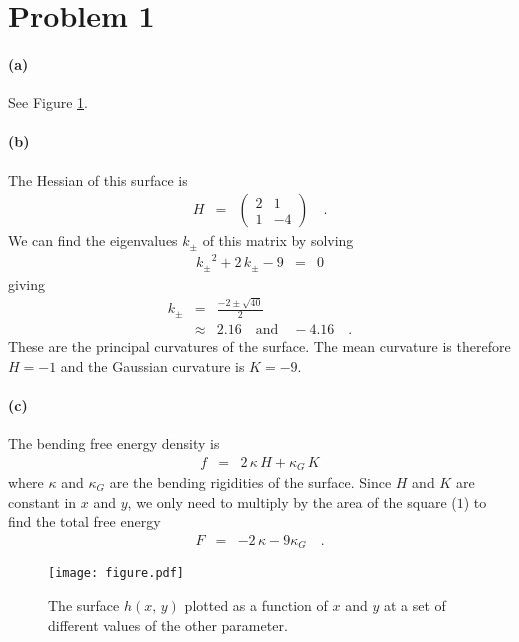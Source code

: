 \documentclass[12pt]{article}
\newcommand{\fig}[1]{Figure \ref{fig:#1}}
\newcommand{\figlabel}[1]{\label{fig:#1}}
\begin{document}
\section{Problem 1}

\paragraph{(a)}

See \fig{curve}.


\paragraph{(b)}

The Hessian of this surface is
\begin{eqnarray}
H &=& \left( \begin{array}{cc}
    2 & 1 \\
    1 & -4
\end{array}\right) \quad.
\end{eqnarray}
We can find the eigenvalues $k_\pm$ of this matrix by solving
\begin{eqnarray}
{k_\pm}^2 + 2\,k_\pm - 9 &=& 0
\end{eqnarray}
giving
\begin{eqnarray}
k_\pm &=& \frac{-2 \pm \sqrt{40}}{2} \\
&\approx& 2.16 \quad \mathrm{and} \quad  -4.16 \quad.
\end{eqnarray}
These are the principal curvatures of the surface.
The mean curvature is therefore $H = -1$ and the Gaussian curvature is $K
= -9$.


\paragraph{(c)}

The bending free energy density is
\begin{eqnarray}
f &=& 2\,\kappa\,H + \kappa_G\,K
\end{eqnarray}
where $\kappa$ and $\kappa_G$ are the bending rigidities of the surface.
Since $H$ and $K$ are constant in $x$ and $y$, we only need to multiply by the
area of the square ($1$) to find the total free energy
\begin{eqnarray}
F &=& -2\,\kappa - 9 \kappa_G \quad.
\end{eqnarray}


\begin{figure}[htbp]
\begin{center}
\texttt{[image: figure.pdf]}
\end{center}
\caption{%
The surface $h(x,\,y)$ plotted as a function of $x$ and $y$ at a set of
different values of the other parameter.
\figlabel{curve}}
\end{figure}
\end{document}
